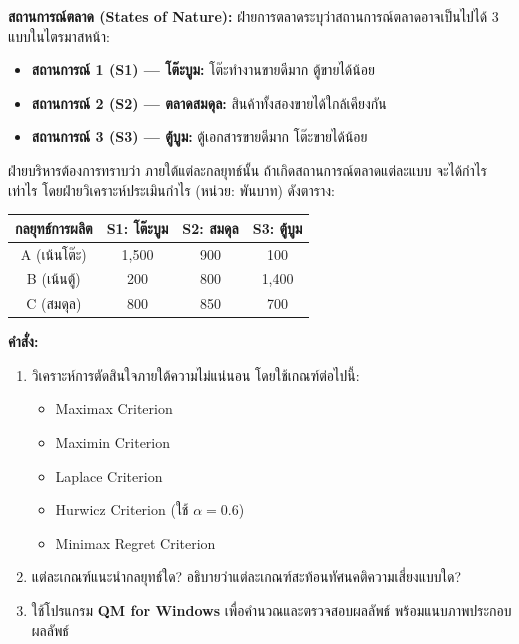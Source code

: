 \noindent
\textbf{สถานการณ์ตลาด (States of Nature):}  
ฝ่ายการตลาดระบุว่าสถานการณ์ตลาดอาจเป็นไปได้ 3 แบบในไตรมาสหน้า:

\begin{itemize}
    \item \textbf{สถานการณ์ 1 (S1) — โต๊ะบูม:} โต๊ะทำงานขายดีมาก ตู้ขายได้น้อย
    \item \textbf{สถานการณ์ 2 (S2) — ตลาดสมดุล:} สินค้าทั้งสองขายได้ใกล้เคียงกัน
    \item \textbf{สถานการณ์ 3 (S3) — ตู้บูม:} ตู้เอกสารขายดีมาก โต๊ะขายได้น้อย
\end{itemize}

ฝ่ายบริหารต้องการทราบว่า ภายใต้แต่ละกลยุทธ์นั้น ถ้าเกิดสถานการณ์ตลาดแต่ละแบบ จะได้กำไรเท่าไร โดยฝ่ายวิเคราะห์ประเมินกำไร (หน่วย: พันบาท) ดังตาราง:

\begin{center}
\begin{tabular}{|c|c|c|c|}
\hline
\textbf{กลยุทธ์การผลิต} & \textbf{S1: โต๊ะบูม} & \textbf{S2: สมดุล} & \textbf{S3: ตู้บูม} \\
\hline
A (เน้นโต๊ะ) & 1,500 & 900 & 100 \\
B (เน้นตู้) & 200 & 800 & 1,400 \\
C (สมดุล) & 800 & 850 & 700 \\
\hline
\end{tabular}
\end{center}

\vspace{1em}
\noindent
\textbf{คำสั่ง:}

\begin{enumerate}
    \item วิเคราะห์การตัดสินใจภายใต้ความไม่แน่นอน โดยใช้เกณฑ์ต่อไปนี้:
    \begin{itemize}
        \item Maximax Criterion
        \item Maximin Criterion
        \item Laplace Criterion
        \item Hurwicz Criterion (ใช้ $\alpha = 0.6$)
        \item Minimax Regret Criterion
    \end{itemize}
    \item แต่ละเกณฑ์แนะนำกลยุทธ์ใด? อธิบายว่าแต่ละเกณฑ์สะท้อนทัศนคติความเสี่ยงแบบใด?
    \item ใช้โปรแกรม \textbf{QM for Windows} เพื่อคำนวณและตรวจสอบผลลัพธ์ พร้อมแนบภาพประกอบผลลัพธ์
\end{enumerate}

